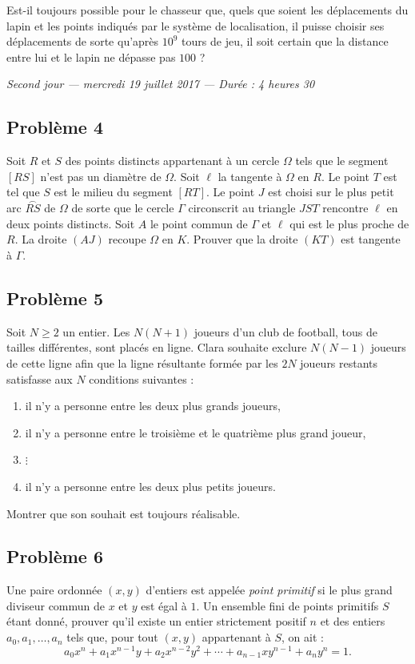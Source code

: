 Est-il toujours possible pour le chasseur que, quels que soient les déplacements du lapin et les points
indiqués par le système de localisation, il puisse choisir ses déplacements de sorte qu'après $10^9$ tours de
jeu, il soit certain que la distance entre lui et le lapin ne dépasse pas $100$ ?

\bigskip
\begin{center}
  \emph{Second jour --- mercredi 19 juillet 2017 --- Durée : 4 heures 30}
\end{center}

\subsection*{Problème 4}
Soit $R$ et $S$ des points distincts appartenant à un cercle $\Omega$ tels que le segment $[RS]$ n'est pas un
diamètre de $\Omega$. Soit $\ell$ la tangente à $\Omega$ en $R$. Le point $T$ est tel que $S$ est le milieu du
segment $[RT]$. Le point $J$ est choisi sur le plus petit arc $\overset{\frown}{RS}$ de $\Omega$ de sorte que
le cercle $\Gamma$ circonscrit au triangle $JST$ rencontre $\ell$ en deux points distincts. Soit $A$ le point
commun de $\Gamma$ et $\ell$ qui est le plus proche de $R$. La droite $(AJ)$ recoupe $\Omega$ en $K$. Prouver
que la droite $(KT)$ est tangente à $\Gamma$.

\subsection*{Problème 5}
Soit $N \geqslant 2$ un entier. Les $N(N+1)$ joueurs d'un club de football, tous de tailles différentes, sont
placés en ligne. Clara souhaite exclure $N(N-1)$ joueurs de cette ligne afin que la ligne résultante formée par
les $2N$ joueurs restants satisfasse aux $N$ conditions suivantes :
\begin{enumerate}
  \item[(1)] il n'y a personne entre les deux plus grands joueurs,
  \item[(2)] il n'y a personne entre le troisième et le quatrième plus grand joueur,
  \item[] $\vdots$
  \item[($N$)] il n'y a personne entre les deux plus petits joueurs.
\end{enumerate}
Montrer que son souhait est toujours réalisable.

\subsection*{Problème 6}
Une paire ordonnée $(x, y)$ d'entiers est appelée \emph{point primitif} si le plus grand diviseur commun de
$x$ et $y$ est égal à $1$. Un ensemble fini de points primitifs $S$ étant donné, prouver qu'il existe un entier
strictement positif $n$ et des entiers $a_0, a_1, \ldots, a_n$ tels que, pour tout $(x, y)$ appartenant à
$S$, on ait :
\[
a_0x^n + a_1x^{n-1}y + a_2x^{n-2}y^2 + \cdots + a_{n-1}xy^{n-1} + a_ny^n = 1.
\]
